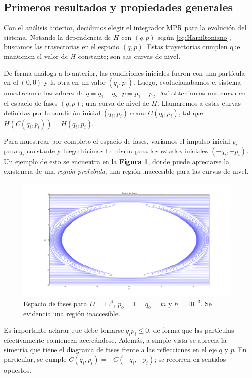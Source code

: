 \documentclass[twoside, 12pt]{article}
\begin{document}
\subsection{Primeros resultados y propiedades generales}

Con el análisis anterior, decidimos elegir el integrador MPR para la evolución del sistema.
Notando la dependencia de $H$ con $(q,p)$ según \eqref{eq:Hamiltoniano}, buscamos las trayectorias en el espacio $(q,p)$.
Estas trayectorias cumplen que mantienen el valor de $H$ constante; son sus curvas de nivel.

De forma análoga a lo anterior, las condiciones iniciales fueron con una partícula en el $(0,0)$ y la otra en un valor $(q_i, p_i)$.
Luego, evolucionabamos el sistema muestreando los valores de $q = q_1 - q_2$, $p = p_1 - p_2$.
Así obteniamos una curva en el espacio de fases $(q,p)$; una curva de nivel de $H$.
Llamaremos a estas curvas definidas por la condición inicial $(q_i,p_i)$ como $C(q_i,p_i)$, tal que $H(C(q_i,p_i))=H(q_i, p_i)$.

Para muestrear por completo el espacio de fases, variamos el impulso inicial $p_i$ para $q_i$ constante y luego hicimos lo mismo para los estados iniciales $(-q_i,-p_i)$.
Un ejemplo de esto se encuentra en la \textbf{Figura \ref{fig:ej_fases}}, donde puede apreciarse la existencia de una \textit{región prohibida}; una región inaccesible para las curvas de nivel.

\begin{figure}[h]
	\centering
	\includegraphics[trim = 0mm 0mm 15mm 10mm, clip, width=\columnwidth]{fases.png}
	\caption{Espacio de fases para $D=10^4$, $p_o=1=q_o=m$ y $h=10^{-3}$. Se evidencia una región inaccesible.}
	\label{fig:ej_fases}
\end{figure}

Es importante aclarar que debe tomarse $q_ip_i\leq 0$, de forma que las partículas efectivamente comiencen acercándose.
Además, a simple vista se aprecia la simetría que tiene el diagrama de fases frente a las reflecciones en el eje $q$ y $p$.
En particular, se cumple $C(q_i,p_i) = -C(-q_i,-p_i)$; se recorren en sentidos opuestos.
\end{document}
